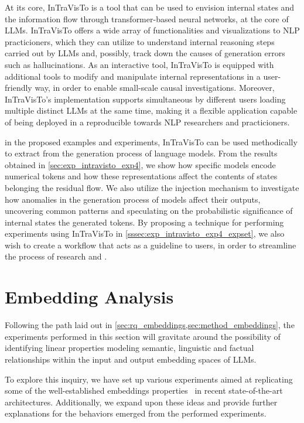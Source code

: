 At its core, InTraVisTo is a tool that can be used to envision internal states and the information flow through transformer-based neural networks, at the core of LLMs.
InTraVisTo offers a wide array of functionalities and visualizations to NLP practicioners, which they can utilize to understand internal reasoning steps carried out by LLMs and, possibly, track down the causes of generation errors such as hallucinations.
As an interactive tool, InTraVisTo is equipped with additional tools to modify and manipulate internal representations in a user-friendly way, in order to enable small-scale causal investigations.
Moreover, InTraVisTo's implementation supports simultaneous  by different users loading multiple distinct LLMs at the same time, making it a flexible application capable of being deployed in a reproducible   towards NLP researchers and practicioners.

 in the proposed examples and experiments, InTraVisTo can be used methodically to extract  from the generation process of language models.
From the results obtained in \cref{sec:exp_intravisto_exp4}, we show how specific models encode numerical tokens and how these representations affect the contents of states belonging the residual flow.
We also utilize the injection mechanism to investigate how anomalies in the generation process of models affect their outputs, uncovering common patterns and speculating on the probabilistic significance of internal states  the generated tokens. 
By proposing a technique for performing experiments using InTraVisTo in \cref{sssec:exp_intravisto_exp4_expset}, we also wish to create a workflow that acts as a guideline to users, in order to streamline the process of research and .

\section{Embedding Analysis}\label{sec:exp_emb}

Following the path laid out in \cref{sec:rq_embeddings,sec:method_embeddings}, the experiments performed in this section will gravitate around the possibility of identifying linear properties modeling semantic, linguistic and factual relationships within the input and output embedding spaces of LLMs.

To explore this inquiry, we have set up various experiments aimed at replicating some of the well-established embeddings properties~\cite{mikolov2013} in recent state-of-the-art architectures.
Additionally, we expand upon these ideas and provide further explanations for the behaviors emerged from the performed experiments.

